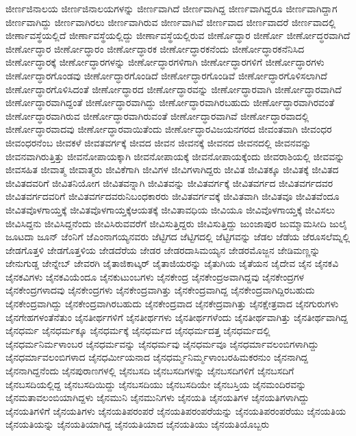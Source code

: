 {ಜೀರ್ಣಜಿನಾಲಯ
ಜೀರ್ಣಜಿನಾಲಯಗಳನ್ನು
ಜೀರ್ಣವಾಗಿದೆ
ಜೀರ್ಣವಾಗಿದ್ದ
ಜೀರ್ಣವಾಗಿದ್ದರೂ
ಜೀರ್ಣವಾಗಿದ್ದಾಗ
ಜೀರ್ಣವಾಗಿದ್ದು
ಜೀರ್ಣವಾಗಿರಲು
ಜೀರ್ಣವಾಗಿರುವ
ಜೀರ್ಣವಾಗಿವೆ
ಜೀರ್ಣವಾದ
ಜೀರ್ಣವಾದರೆ
ಜೀರ್ಣವಾದಲ್ಲಿ
ಜೀರ್ಣಾವಸ್ಥೆಯಲ್ಲಿದೆ
ಜೀರ್ಣಾವಸ್ಥೆಯಲ್ಲಿದ್ದು
ಜೀರ್ಣಾವಸ್ಥೆಯಲ್ಲಿರುವ
ಜೀರ್ಣೊದ್ಧಾರ
ಜೀರ್ಣೋ
ಜೀರ್ಣೋದ್ಧರವಾಗಿದೆ
ಜೀರ್ಣೋದ್ಧಾರ
ಜೀರ್ಣೋದ್ಧಾರಂ
ಜೀರ್ಣೋದ್ಧಾರಕ
ಜೀರ್ಣೋದ್ಧಾರಕನೆಂದು
ಜೀರ್ಣೋದ್ಧಾರಕನೆನಿಸಿದ
ಜೀರ್ಣೋದ್ಧಾರಕ್ಕೆ
ಜೀರ್ಣೋದ್ಧಾರಗಳನ್ನು
ಜೀರ್ಣೋದ್ಧಾರಗಳಿಗಾಗಿ
ಜೀರ್ಣೋದ್ಧಾರಗಳಿಗೆ
ಜೀರ್ಣೋದ್ಧಾರಗಳು
ಜೀರ್ಣೋದ್ಧಾರಗೊಂಡವು
ಜೀರ್ಣೋದ್ಧಾರಗೊಂಡಿದೆ
ಜೀರ್ಣೋದ್ಧಾರಗೊಂಡಿವೆ
ಜೀರ್ಣೋದ್ಧಾರಗೊಳಿಸಲಾಗಿದೆ
ಜೀರ್ಣೋದ್ಧಾರಗೊಳಿಸಿದಂತೆ
ಜೀರ್ಣೋದ್ಧಾರದ
ಜೀರ್ಣೋದ್ಧಾರವನ್ನು
ಜೀರ್ಣೋದ್ಧಾರವಾಗಿ
ಜೀರ್ಣೋದ್ಧಾರವಾಗಿದೆ
ಜೀರ್ಣೋದ್ಧಾರವಾಗಿದ್ದಂತೆ
ಜೀರ್ಣೋದ್ಧಾರವಾಗಿದ್ದು
ಜೀರ್ಣೋದ್ಧಾರವಾಗಿರಬಹುದು
ಜೀರ್ಣೋದ್ಧಾರವಾಗಿರವಂತೆ
ಜೀರ್ಣೋದ್ಧಾರವಾಗಿರುವ
ಜೀರ್ಣೋದ್ಧಾರವಾಗಿರುವಂತೆ
ಜೀರ್ಣೋದ್ಧಾರವಾಗಿವೆ
ಜೀರ್ಣೋದ್ಧಾರವಾದಲ್ಲಿ
ಜೀರ್ಣೋದ್ಧಾರವಾದವು
ಜೀರ್ಣೋದ್ಧಾರವಾಯಿತೆಂದು
ಜೀರ್ಣೋದ್ಧಾರವಿಜಯನಗರದ
ಜೀವಂತವಾಗಿ
ಜೀವಂಧರ
ಜೀವಂಧರನೆಂಬ
ಜೀವಕಳೆ
ಜೀವತವರ್ಗಕ್ಕೆ
ಜೀವದ
ಜೀವನ
ಜೀವನಕ್ಕೆ
ಜೀವನದ
ಜೀವನದಲ್ಲಿ
ಜೀವನವನ್ನು
ಜೀವನವಾಗಿರುತ್ತಿತ್ತು
ಜೀವನೋಪಾಯಕ್ಕಾಗಿ
ಜೀವನೋಪಾಯಕ್ಕೆ
ಜೀವನೋಪಾಯಕ್ಕೆಂದು
ಜೀವರಾಶಿಯಲ್ಲಿ
ಜೀವವನ್ನು
ಜೀವಸಹಿತ
ಜೀವಾತ್ಮ
ಜೀವಾತ್ಮರು
ಜೀವಿಕೆಗಾಗಿ
ಜೀವಿಗಳ
ಜೀವಿಗಳಾಗಿದ್ದರು
ಜೀವಿತ
ಜೀವಿತಕ್ಕೂ
ಜೀವಿತಕ್ಕೆ
ಜೀವಿತದ
ಜೀವಿತದವರಿಗೆ
ಜೀವಿತನಿಯೋಗ
ಜೀವಿತವನ್ನಾಗಿ
ಜೀವಿತವನ್ನು
ಜೀವಿತವರ್ಗಕ್ಕೆ
ಜೀವಿತವರ್ಗದ
ಜೀವಿತವರ್ಗದವರ
ಜೀವಿತವರ್ಗದವರಿಗೆ
ಜೀವಿತವರ್ಗದವರುನಿಬಂಧಕಾರರು
ಜೀವಿತವರ್ಗವಕ್ಕೆ
ಜೀವಿತವಾಗಿ
ಜೀವಿತವೂ
ಜೀವಿತವೆಂದೂ
ಜೀವಿತವೊಳಗಾಯ್ತಕ್ಕೆ
ಜೀವಿತವೊಳಗಾಯ್ತಕ್ಕೆಆಯತಕ್ಕೆ
ಜೀವಿತಾವಧಿಯ
ಜೀವಿಯೂ
ಜೀವಿವೊಳಗಾಯ್ತಕ್ಕೆ
ಜೀವಿಸಲು
ಜೀವಿಸಿದ್ದನು
ಜೀವಿಸಿದ್ದನೆಂದು
ಜೀವಿಸಿರುವವರೆಗೆ
ಜೀವಿಸುತ್ತಿದ್ದರು
ಜೀವಿಸುತ್ತಿದ್ದು
ಜುಂಜಾಪುರ
ಜುಮ್ಮಾಮಸೀದಿ
ಜುಲೈ
ಜೂಟದಾ
ಜೂನ್
ಜೆಂನಿಗೆ
ಜೆಎಂನಾಗಯ್ಯನವರು
ಜೆಟ್ಟಿಗದ
ಜೆಟ್ಟಿಗದಲ್ಲಿ
ಜೆಟ್ಟಿಗವನ್ನು
ಜೆಡಲ
ಜೆಡೆಯ
ಜೆರೂಸಲೆಮ್ನಲ್ಲಿ
ಜೇಡಗೊತ್ತಳಿ
ಜೇಡಗೊತ್ತಳಿಯ
ಜೇಡದೆರೆಯ
ಜೇಡರ
ಜೇಡರದಾಸಿಮಯ್ಯನ
ಜೇಡರಮೊಜ್ಜನ
ಜೇಡಿಮಣ್ಣನ್ನು
ಜೇನುಗುಡ್ಡ
ಜೇನ್ನೇಬ್
ಜೇವರಗಿ
ಜೈತಾಜಿಕಾಟ್ಕರ್
ಜೈತಾಜಿಯರನ್ನು
ಜೈತುಗಿಯ
ಜೈತೆಯನ
ಜೈದೇವ
ಜೈನ
ಜೈನಕವಿ
ಜೈನಕವಿಗಳು
ಜೈನಕವಿಯೆಂದೂ
ಜೈನಕುಟುಂಬಗಳು
ಜೈನಕೇಂದ್ರ
ಜೈನಕೇಂದ್ರಅವಾಗಿದ್ದವು
ಜೈನಕೇಂದ್ರಗಳ
ಜೈನಕೇಂದ್ರಗಳಾದವು
ಜೈನಕೇಂದ್ರಗಳು
ಜೈನಕೇಂದ್ರವಾಗಿತ್ತು
ಜೈನಕೇಂದ್ರವಾಗಿದ್ದ
ಜೈನಕೇಂದ್ರವಾಗಿದ್ದಿರಬಹುದು
ಜೈನಕೇಂದ್ರವಾಗಿದ್ದು
ಜೈನಕೇಂದ್ರವಾಗಿರಬಹುದು
ಜೈನಕೇಂದ್ರವಾದ
ಜೈನಕೇದ್ರವಾಗಿತ್ತು
ಜೈನಕ್ಷೇತ್ರವಾದ
ಜೈನಗುರುಗಳು
ಜೈನಗೇಹಗಳಂತೆನೆತುಂ
ಜೈನತೀರ್ಥಗಳಿಗೆ
ಜೈನತೀರ್ಥಗಳು
ಜೈನತೀರ್ಥಗಳೆಂದು
ಜೈನತೀರ್ಥವಾಗಿತ್ತು
ಜೈನತೀರ್ಥವಾಗಿದ್ದ
ಜೈನಧರ್ಮ
ಜೈನಧರ್ಮಕ್ಕೂ
ಜೈನಧರ್ಮಕ್ಕೆ
ಜೈನಧರ್ಮದ
ಜೈನಧರ್ಮದತ್ತ
ಜೈನಧರ್ಮದಲ್ಲಿ
ಜೈನಧರ್ಮನಿರ್ಮಳಾಂಬರ
ಜೈನಧರ್ಮವನ್ನು
ಜೈನಧರ್ಮವು
ಜೈನಧರ್ಮವೂ
ಜೈನಧರ್ಮಾವಲಂಬಿಗಳಾಗಿದ್ದು
ಜೈನಧರ್ಮಾವಲಂಬಿಗಳಾದ
ಜೈನಧರ್ಮೀಯನಾದ
ಜೈನಧರ್ಮ್ಮನಿರ್ಮ್ಮಳಾಂಬರಹಿಮಕರನುಂ
ಜೈನನಾಗಿದ್ದ
ಜೈನನಾಗಿದ್ದನೆಂದು
ಜೈನಪುರಾಣಗಳಲ್ಲಿ
ಜೈನಬಸದಿ
ಜೈನಬಸದಿಗಳನ್ನು
ಜೈನಬಸದಿಗಳಿಗೆ
ಜೈನಬಸದಿಗೆ
ಜೈನಬಸದಿಯಲ್ಲಿದ್ದ
ಜೈನಬಸದಿಯಿದ್ದು
ಜೈನಬಸದಿಯು
ಜೈನಬಸದಿಯೇ
ಜೈನಬಸ್ತಿಯ
ಜೈನಮಂದಿರವನ್ನು
ಜೈನಮತಾವಲಂಬಿಯಾಗಿದ್ದಳು
ಜೈನಮುನಿ
ಜೈನಮುನಿಗಳು
ಜೈನಯತಿ
ಜೈನಯತಿಗಳ
ಜೈನಯತಿಗಳಾಗಿದ್ದು
ಜೈನಯತಿಗಳಿಗೆ
ಜೈನಯತಿಗಳು
ಜೈನಯತಿಪರಂಪರೆ
ಜೈನಯತಿಪರಂಪರೆಯನ್ನು
ಜೈನಯತಿಪರಂಪರೆಯು
ಜೈನಯತಿಯ
ಜೈನಯತಿಯನ್ನು
ಜೈನಯತಿಯಾಗಿದ್ದ
ಜೈನಯತಿಯಾದ
ಜೈನಯತಿಯು
ಜೈನಯತಿಯೊಬ್ಬರು
}
